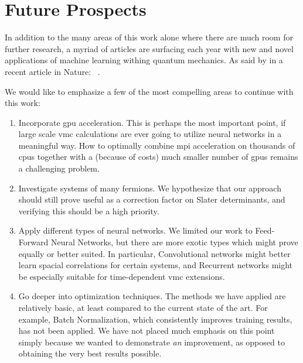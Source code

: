 \documentclass[Thesis.tex]{subfiles}
\begin{document}
\section{Future Prospects}

In addition to the many areas of this work alone where there are much room for
further research, a myriad of articles are surfacing each year with new and
novel applications of machine learning withing quantum mechanics. As said by
\citeauthor{Melko-2019} in a recent article in Nature: ~\cite{Melko-2019}.

We would like to emphasize a few of the most compelling areas to continue with
this work:

\begin{enumerate}
\item Incorporate \gls{gpu} acceleration. This is perhaps the most important point, if
  large scale \gls{vmc} calculations are ever going to utilize neural networks in a
  meaningful way. How to optimally combine \gls{mpi} acceleration on thousands of \glspl{cpu}
  together with a (because of costs) much smaller number of \glspl{gpu} remains a
  challenging problem.
\item Investigate systems of many fermions. We hypothesize that our approach
  should still prove useful as a correction factor on Slater determinants, and
  verifying this should be a high priority.
\item Apply different types of neural networks. We limited our work to
  Feed-Forward Neural Networks, but there are more exotic types which might
  prove equally or better suited. In particular, Convolutional networks might
  better learn spacial correlations for certain systems, and Recurrent networks
  might be especially suitable for time-dependent \gls{vmc} extensions.
\item Go deeper into optimization techniques. The methods we have applied are
  relatively basic, at least compared to the current state of the art. For example,
  Batch Normalization, which consistently improves training results, has not
  been applied. We have not placed much emphasis on this point simply because we
  wanted to demonstrate \emph{an} improvement, as opposed to obtaining the very
  best results possible.
\end{enumerate}
\end{document}
